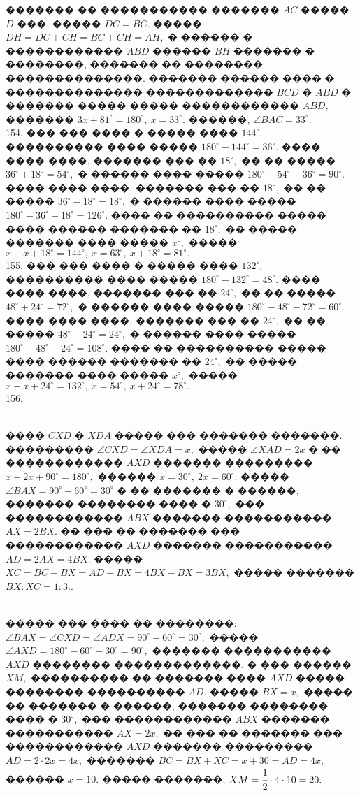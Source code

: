 \documentclass[12pt]{article}
\begin{document}
������� �� ����������� ������� $AC$ ����� $D$ ���, ����� $DC=BC.$ ����� $DH=DC+CH=BC+CH=AH,$ � ������ � ������������ $ABD$ ������ $BH$ ������� � ��������, ������� �� �������� ��������������. ������� ������ ���� � �������������� ������������� $BCD$ � $ABD$ � ������� ����� ����� ������������ $ABD,$ ������� $3x+81^\circ=180^\circ,\ x=33^\circ.$ ������, $\angle BAC=33^\circ.$\\
154. ��� ��� ���� � ����� ���� $144^\circ,$ ���������� ���� ����� $180^\circ-144^\circ=36^\circ.$ ���� ���� ����, ������� ��� �� $18^\circ,$ �� �� ����� $36^\circ+18^\circ=54^\circ,$ � ������ ���� ����� $180^\circ-54^\circ-36^\circ=90^\circ.$ ���� ���� ����, ������� ��� �� $18^\circ,$ �� �� ����� $36^\circ-18^\circ=18^\circ,$ � ������ ���� �����
$180^\circ-36^\circ-18^\circ=126^\circ.$ ���� �� ���������� ����� ���� ������ ������� �� $18^\circ,$ �� ����� ������� ���� ����� $x^\circ,$ �����
$x+x+18^\circ=144^\circ,\ x=63^\circ,\ x+18^\circ=81^\circ.$\\
155. ��� ��� ���� � ����� ���� $132^\circ,$ ���������� ���� ����� $180^\circ-132^\circ=48^\circ.$ ���� ���� ����, ������� ��� �� $24^\circ,$ �� �� ����� $48^\circ+24^\circ=72^\circ,$ � ������ ���� ����� $180^\circ-48^\circ-72^\circ=60^\circ.$ ���� ���� ����, ������� ��� �� $24^\circ,$ �� �� ����� $48^\circ-24^\circ=24^\circ,$ � ������ ���� �����
$180^\circ-48^\circ-24^\circ=108^\circ.$ ���� �� ���������� ����� ���� ������ ������� �� $24^\circ,$ �� ����� ������� ���� ����� $x^\circ,$ �����
$x+x+24^\circ=132^\circ,\ x=54^\circ,\ x+24^\circ=78^\circ.$\\
156. \begin{figure}[ht!]
\end{figure}\\
���� $CXD$ � $XDA$ ����� ��� ������� �������. ��������� $\angle CXD=\angle XDA=x,$ ����� $\angle XAD=2x$ � �� ������������ $AXD$ ������� ��������� $x+2x+90^\circ=180^\circ,$ ������ $x=30^\circ,\ 2x=60^\circ.$ ����� $\angle BAX=90^\circ-60^\circ=30^\circ$ � �� ������� � ������, ������� �������� ���� � $30^\circ,$ ��� ������������ $ABX$ ������� ����������� $AX=2BX.$ �� ��� �� ������� ��� ������������ $AXD$ ������� ����������� $AD=2AX=4BX.$ ����� $XC=BC-BX=AD-BX=4BX-BX=3BX,$ ����� ������� $BX:XC=1:3.$\newpage{}. \begin{figure}[ht!]
\end{figure}\\
����� ��� ���� �� ��������: $\angle BAX=\angle CXD=\angle ADX=90^\circ-60^\circ=30^\circ,$ ����� $\angle AXD=180^\circ-60^\circ-30^\circ=90^\circ,$ ������� ����������� $AXD$ �������� �������������, � ��� ������ $XM,$ ���������� �� ������� ���� $AXD$ ����� �������� ���������� $AD.$ ����� $BX=x,$ ����� �� ������� � ������, ������� �������� ���� � $30^\circ,$ ��� ������������ $ABX$ ������� ����������� $AX=2x,$ �� ��� �� ������� ��� ������������ $AXD$ ������� ��������� $AD=2\cdot2x=4x,$ ������� $BC=BX+XC=x+30=AD=4x,$ ������ $x=10.$ ����� �������, $XM=\cfrac{1}{2}\cdot4\cdot10=20.$\\
\end{document}
